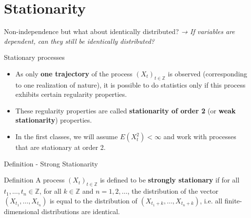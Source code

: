 \documentclass{beamer}
\begin{document}

\section{Stationarity}

\begin{frame}{Non-independence but what about identically distributed?}
\vfill
\centering
\Large
\textit{→ If variables are dependent, can they still be identically distributed?}
\vfill
\end{frame}



\begin{frame}{Stationary processes}
\small
\begin{itemize}
    \item As only \textbf{one trajectory} of the process $(X_t)_{t \in \mathbb{Z}}$ is observed (corresponding to one realization of nature),
    it is possible to do statistics only if this process exhibits certain regularity properties.
    \vspace{0.3cm}
    \item These regularity properties are called \textbf{stationarity of order 2} (or \textbf{weak stationarity}) properties.
    \vspace{0.3cm}
    \item In the first classes, we will assume $E(X_t^2) < \infty$ and work with processes that are stationary at order 2.
\end{itemize}
\end{frame}





\begin{frame}{Definition - Strong Stationarity}
\small
\begin{block}{Definition}
A process $(X_t)_{t \in \mathbb{Z}}$ is defined to be \textbf{strongly stationary} if  
for all $t_1, \ldots, t_n \in \mathbb{Z}$, for all $k \in \mathbb{Z}$ and $n = 1, 2, \ldots$,  
the distribution of the vector $(X_{t_1}, \ldots, X_{t_n})$  
is equal to the distribution of $(X_{t_1 + k}, \ldots, X_{t_n + k})$,  
i.e. all finite-dimensional distributions are identical.
\end{block}
\end{frame}
\end{document}
